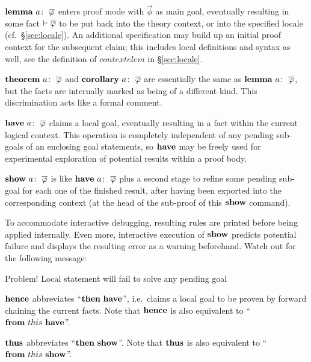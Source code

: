 \begin{descr}
  
\item [$\LEMMA{a}{\vec\phi}$] enters proof mode with $\vec\phi$ as main goal,
  eventually resulting in some fact $\vdash \overline{\varphi}$ to be put back into the
  theory context, or into the specified locale (cf.\ \S\ref{sec:locale}).  An
  additional  specification may build up an initial proof
  context for the subsequent claim; this includes local definitions and syntax
  as well, see the definition of $contextelem$ in \S\ref{sec:locale}.
  
\item [$\THEOREM{a}{\vec\phi}$ and $\COROLLARY{a}{\vec\phi}$] are essentially
  the same as $\LEMMA{a}{\vec\phi}$, but the facts are internally marked as
  being of a different kind.  This discrimination acts like a formal comment.
  
\item [$\HAVE{a}{\vec\phi}$] claims a local goal, eventually resulting in a
  fact within the current logical context.  This operation is completely
  independent of any pending sub-goals of an enclosing goal statements, so
  ${\mathord{\mathbf{have}}}$ may be freely used for experimental exploration of potential
  results within a proof body.
  
\item [$\SHOW{a}{\vec\phi}$] is like $\HAVE{a}{\vec\phi}$ plus a second stage
  to refine some pending sub-goal for each one of the finished result, after
  having been exported into the corresponding context (at the head of the
  sub-proof of this ${\mathord{\mathbf{show}}}$ command).
  
  To accommodate interactive debugging, resulting rules are printed before
  being applied internally.  Even more, interactive execution of ${\mathord{\mathbf{show}}}$
  predicts potential failure and displays the resulting error as a warning
  beforehand.  Watch out for the following message:

  \begin{ttbox}
  Problem! Local statement will fail to solve any pending goal
  \end{ttbox}
  
\item [${\mathord{\mathbf{hence}}}$] abbreviates ``${\mathord{\mathbf{then}}}~{\mathord{\mathbf{have}}}$'', i.e.\ claims a local
  goal to be proven by forward chaining the current facts.  Note that
  ${\mathord{\mathbf{hence}}}$ is also equivalent to ``${\mathord{\mathbf{from}}}~this~{\mathord{\mathbf{have}}}$''.
  
\item [${\mathord{\mathbf{thus}}}$] abbreviates ``${\mathord{\mathbf{then}}}~{\mathord{\mathbf{show}}}$''.  Note that ${\mathord{\mathbf{thus}}}$
  is also equivalent to ``${\mathord{\mathbf{from}}}~this~{\mathord{\mathbf{show}}}$''.

\end{descr}

